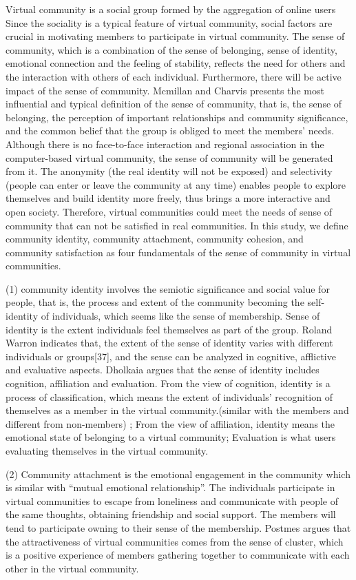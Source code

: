 \documentclass{elsarticle}
\begin{document}
Virtual community is a social group formed by the aggregation of online users Since the sociality is a typical feature of virtual community, social factors are crucial in motivating members to participate in virtual community. The sense of community, which is a combination of the sense of belonging, sense of identity, emotional connection and the feeling of stability, reflects the need for others and the interaction with others of each individual. Furthermore, there will be active impact of the sense of community. Mcmillan and Charvis presents the most influential and typical definition of the sense of community, that is, the sense of belonging, the perception of important relationships and community significance, and the common belief that the group is obliged to meet the members’ needs. Although there is no face-to-face interaction and regional association in the computer-based virtual community, the sense of community will be generated from it. The anonymity (the real identity will not be exposed) and selectivity (people can enter or leave the community at any time) enables people to explore themselves and build identity more freely, thus brings a more interactive and open society. Therefore, virtual communities could meet the needs of sense of community that can not be satisfied in real communities. In this study, we define community identity, community attachment, community cohesion, and community satisfaction as four fundamentals of the sense of community in virtual communities.      

(1) community identity involves the semiotic significance and social value for people, that is, the process and extent of the community becoming the self-identity of individuals, which seems like the sense of membership. Sense of identity is the extent individuals feel themselves as part of the group. Roland Warron indicates that, the extent of the sense of identity varies with different individuals or groups[37], and the sense can be analyzed in cognitive, afflictive and evaluative aspects. Dholkaia argues that the sense of identity includes cognition, affiliation and evaluation. From the view of cognition, identity is a process of classification, which means the extent of individuals’ recognition of themselves as a member in the virtual community.(similar with the members and different from non-members) ; From the view of affiliation, identity means the emotional state of belonging to a virtual community; Evaluation is what users evaluating themselves in the virtual community.    

(2)  Community attachment is the emotional engagement in the community which is similar with “mutual emotional relationship”. The individuals participate in virtual communities to escape from loneliness and communicate with people of the same thoughts, obtaining friendship and social support. The members will tend to participate owning to their sense of the membership. Postmes argues that the attractiveness of virtual communities comes from the sense of cluster, which is a positive experience of members gathering together to communicate with each other in the virtual community.     
\end{document}
